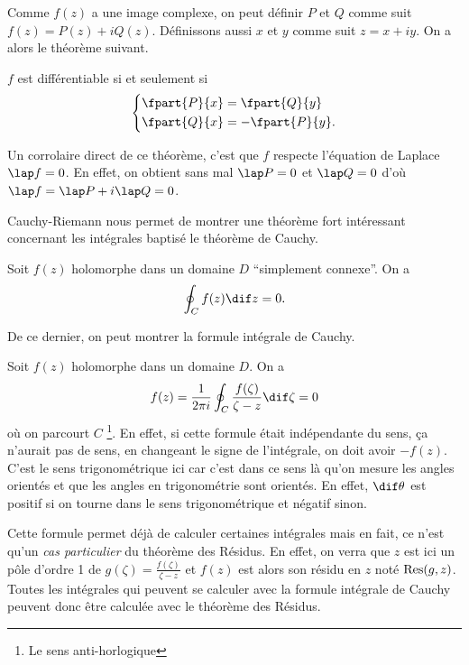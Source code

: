 Comme $f(z)$ a une image complexe,
on peut définir $P$ et $Q$ comme suit $f(z) = P(z) + iQ(z)$.
Définissons aussi $x$ et $y$ comme suit $z = x + iy$.
On a alors le théorème suivant.
\begin{mytheo}
  $f$ est différentiable si et seulement si
  \[ \left\{\begin{aligned}
      \fpart{P}{x} & = \fpart{Q}{y}\\
      \fpart{Q}{x} & = -\fpart{P}{y}.
  \end{aligned}\right. \]
\end{mytheo}

Un corrolaire direct de ce théorème, c'est que $f$ respecte l'équation
de Laplace $\lap f = 0$.
En effet, on obtient sans mal $\lap P = 0$ et $\lap Q = 0$ d'où
$\lap f = \lap P + i\lap Q = 0$.

Cauchy-Riemann nous permet de montrer
une théorème fort intéressant concernant les intégrales baptisé le
théorème de Cauchy.
\begin{mytheo}
  Soit $f(z)$ holomorphe dans un domaine $D$ ``simplement connexe''.
  On a
  \[ \oint_C f(z) \dif z = 0. \]
\end{mytheo}
De ce dernier, on peut montrer la formule intégrale de Cauchy.
\begin{mytheo}
  \label{thm:int}
  Soit $f(z)$ holomorphe dans un domaine $D$. %
  On a
  \[ f(z) = \frac{1}{2\pi i}\oint_C
  \frac{f(\zeta)}{\zeta-z} \dif \zeta = 0 \]
  où on parcourt $C$ 
  \footnote{Le sens anti-horlogique}.
  En effet, si cette formule était indépendante du sens,
  ça n'aurait pas de sens,
  en changeant le signe de l'intégrale,
  on doit avoir $-f(z)$.
  C'est le sens trigonométrique ici car c'est dans ce sens
  là qu'on mesure les angles orientés et que les angles en trigonométrie
  sont orientés.
  En effet, $\dif \theta$ est positif si on tourne dans le sens
  trigonométrique et négatif sinon.
\end{mytheo}

Cette formule permet déjà de calculer certaines intégrales mais
en fait, ce n'est qu'un \emph{cas particulier} du théorème des Résidus.
En effet, on verra que $z$ est ici un pôle d'ordre 1 de
$g(\zeta)=\frac{f(\zeta)}{\zeta-z}$
et $f(z)$ est alors son résidu en $z$ noté
$\operatorname{Res}(g,z)$.
Toutes les intégrales qui peuvent se calculer avec la formule
intégrale de Cauchy peuvent donc être calculée avec le théorème
des Résidus.

